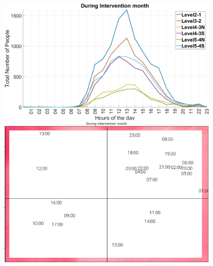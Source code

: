 \begin{figure}[htb]
    \begin{minipage}[b]{0.5\textwidth}
    \includegraphics[width=\textwidth]{image/during_int.jpg}%
    \end{minipage}
    \begin{minipage}[b]{0.39\textwidth}
    \includegraphics[width=\textwidth]{image/Chapters/Chapter6/timeseriesDuring.png}
    \end{minipage}
    

\end{figure}
